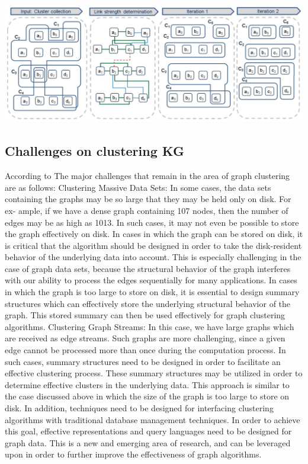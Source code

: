 \documentclass[runningheads]{llncs}
\begin{document}
\begin{center}
\includegraphics[width=1\textwidth]{clip_overlap_resolution.png}
\end{center}

\subsection{Challenges on clustering KG}
According to \cite{Aggarwal} The major challenges that remain in the area of graph clustering are as follows:
Clustering Massive Data Sets: In some cases, the data sets containing the graphs may be so large that they may be held only on disk. For ex- ample, if we have a dense graph containing 107 nodes, then the number of edges may be as high as 1013. In such cases, it may not even be possible to store the graph effectively on disk. In cases in which the graph can be stored on disk, it is critical that the algorithm should be designed in order to take the disk-resident behavior of the underlying data into account. This is especially challenging in the case of graph data sets, because the structural behavior of the graph interferes with our ability to process the edges sequentially for many applications. In cases in which the graph is too large to store on disk, it is essential to design summary structures which can effectively store the underlying structural behavior of the graph. This stored summary can then be used effectively for graph clustering algorithms.
Clustering Graph Streams: In this case, we have large graphs which are received as edge streams. Such graphs are more challenging, since a given edge cannot be processed more than once during the computation process. In such cases, summary structures need to be designed in order to facilitate an effective clustering process. These summary structures may be utilized in order to determine effective clusters in the underlying data. This approach is similar to the case discussed above in which the size of the graph is too large to store on disk.
In addition, techniques need to be designed for interfacing clustering algorithms with traditional database management techniques. In order to achieve this goal, effective representations and query languages need to be designed for graph data. This is a new and emerging area of research, and can be leveraged upon in order to further improve the effectiveness of graph algorithms.
\end{document}

